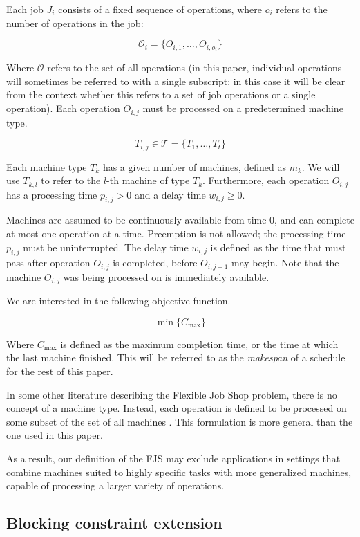 \documentclass[a4paper,10pt]{article}
\begin{document}
Each job $J_i$ consists of a fixed sequence of operations, where $o_i$ refers to the number of operations in the job:

\[ \mathcal{O}_i = \{O_{i,1}, \dots, O_{i, o_i}\} \]

Where $\mathcal{O}$ refers to the set of all operations (in this paper, individual operations will sometimes be referred to with a single subscript; in this case it will be clear from the context whether this refers to a set of job operations or a single operation). Each operation $O_{i,j}$ must be processed on a predetermined machine type.

\[ T_{i,j} \in \mathcal{T} = \{T_1, \dots, T_t\} \]

Each machine type $T_k$ has a given number of machines, defined as $m_k$. We will use $T_{k,l}$ to refer to the $l$-th machine of type $T_k$. Furthermore, each operation $O_{i,j}$ has a processing time $p_{i,j} > 0$ and a delay time $w_{i,j} \geq 0$.

Machines are assumed to be continuously available from time 0, and can complete at most one operation at a time. Preemption is not allowed; the processing time $p_{i,j}$ must be uninterrupted. The delay time $w_{i,j}$ is defined as the time that must pass after operation $O_{i,j}$ is completed, before $O_{i,j + 1}$ may begin. Note that the machine $O_{i,j}$ was being processed on is immediately available.

We are interested in the following objective function.

\[ \min \{ C_\text{max} \} \]

Where $C_\text{max}$ is defined as the maximum completion time, or the time at which the last machine finished. This will be referred to as the \emph{makespan} of a schedule for the rest of this paper.

In some other literature describing the Flexible Job Shop problem, there is no concept of a machine type. Instead, each operation is defined to be processed on some subset of the set of all machines \cite{approxfjsp}. This formulation is more general than the one used in this paper.

As a result, our definition of the FJS may exclude applications in settings that combine machines suited to highly specific tasks with more generalized machines, capable of processing a larger variety of operations.

\subsection{Blocking constraint extension}
\end{document}
